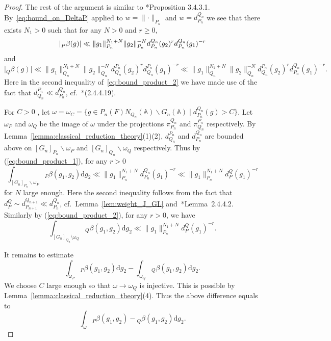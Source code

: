 \documentclass[letterpaper,11pt]{amsart}
\newcommand{\bA}{\mathbb{A}}
\newcommand{\rd}{\mathrm{d}}
\newcommand{\bs}{\backslash}
\newcommand{\<}{\negthickspace}
\providecommand{\abs}[1]{\lvert#1\rvert}
\providecommand{\aabs}[1]{\lVert#1\rVert}
\theoremstyle{definition}
\theoremstyle{plain}
\theoremstyle{remark}
\numberwithin{equation}{section}
\begin{document}
\begin{proof}
The rest of the argument is similar to \cite{BPCZ}*{Proposition 3.4.3.1}.
By~\eqref{eq:bound_on_DeltaP} applied to $w=\aabs{\cdot}_{P_n}$ and
$w=d_{P_{n}}^{Q_{n}}$ we see that there exists $N_1>0$ such that for any
$N>0$ and $r \ge 0$,
    \begin{equation} \label{eq:bound_product_1}
    \abs{\prescript{}{P}{\beta}(g)} \ll
    \aabs{ g_1 }_{P_n}^{N_1+N} \aabs{g_2}_{P_n}^{-N}
    d_{P_{n}}^{Q_{n}}(g_2)^r d_{P_{n}}^{Q_{n}}(g_1)^{-r}
    \end{equation}
and
    \begin{equation} \label{eq:bound_product_2}
    \abs{ {}_Q \beta(g)} \ll \aabs{g_1}_{Q_n}^{N_1+N}
    \aabs{ g_2 }_{Q_n}^{-N} d_{Q_{n}}^{P_{n}}(g_2)^r
    d_{Q_{n}}^{P_{n}}(g_1)^{-r} \ll \aabs{g_1}_{Q_n}^{N_1+N}
    \aabs{ g_2 }_{Q_n}^{-N} d_{Q_{n}}^{P_{n}}(g_2)^r
    d_{P_{n}}^{Q_{n}}(g_1)^{-r}.
    \end{equation}
Here in the second inequality of~\eqref{eq:bound_product_2} we have made use of the fact that $d_{Q_n}^{P_n} \ll d_{P_n}^{Q_n}$, cf.~\cite{BPCZ}*{(2.4.4.19)}.

For $C>0$ , let $\omega = \omega_C = \{g \in P_n(F) N_{Q_n}(\bA) \backslash
G_n(\bA) \mid d_{P_{n}}^{Q_{n}}(g)>C \}$. Let $\omega_P$ and $\omega_Q$
be the image of $\omega$ under the projections $\pi_{P_n}^{Q_n}$ and $\pi_{Q_n}^{P_n}$ respectively. By Lemma~\ref{lemma:classical_reduction_theory}(1)(2),
$d_{Q_{n}}^{P_{n}}$ and
$d_{P_{n}}^{Q_{n}}$ are bounded above on $[G_n]_{P_n} \bs \omega_P$ and
$[G_n]_{Q_n} \bs \omega_Q$ respectively. Thus by (\ref{eq:bound_product_1}),
for any $r>0$
    \[
    \int_{[G_n]_{P_n}\bs \omega_P}
    {}_P \beta(g_1,g_2) \rd g_2 \ll
     \|g_1\|_{P_n}^{N_1+N} d_{P_{n}}^{Q_{n}}(g_1)^{-r} \ll  \|g_1\|_{P_n}^{N_1+N} d_{P}^{Q}(g_1)^{-r}
    \]
for $N$ large enough. Here the second inequality follows from the fact that $d_P^Q \sim d_{P_{n+1}}^{Q_{n+1}} \ll d_{P_n}^{Q_n}$, cf.~Lemma~\ref{lem:weight_J_GL} and~\cite{BPCZ}*{Lemma~2.4.4.2}.
Similarly by (\ref{eq:bound_product_2}), for any $r>0$, we have
    \[
    \int_{[G_n]_{Q_n}\setminus \omega_Q} {}_Q \beta(g_1,g_2) \rd g_2
    \ll \|g_1\|_{P_n}^{N_1+N} d_{P}^{Q}(g_1)^{-r}.
    \]

It remains to estimate
    \[
    \int_{\omega_P} {}_P \beta(g_1,g_2) \rd g_2 -
    \int_{\omega_Q} {}_Q \beta(g_1,g_2) \rd g_2.
    \]
We choose $C$ large enough so that $\omega \to \omega_Q$ is injective.
This is possible by Lemma~\ref{lemma:classical_reduction_theory}(4).
Thus the above difference equals to
    \begin{equation} \label{eq:integrate_over_omega}
    \int_{\omega} {}_P \beta(g_1,g_2)  - {}_Q \beta(g_1,g_2) \rd g_2.
    \end{equation}


\end{proof}
\end{document}
